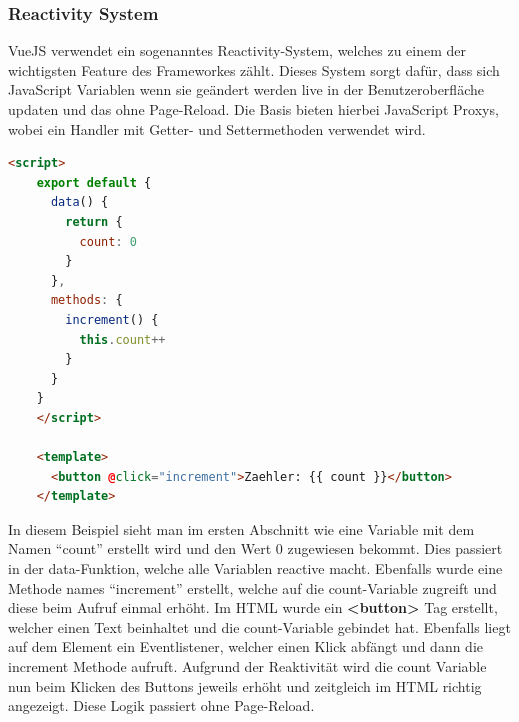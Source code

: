 \cite{frontend_web_vuejs_api}

\subsubsection{Reactivity System}
VueJS verwendet ein sogenanntes Reactivity-System, welches zu einem der wichtigsten Feature des Frameworkes zählt. Dieses System sorgt dafür, dass sich JavaScript Variablen wenn sie geändert werden live in der Benutzeroberfläche updaten und das ohne Page-Reload. Die Basis bieten hierbei JavaScript Proxys, wobei ein Handler mit Getter- und Settermethoden verwendet wird. 
\newpage
\begin{lstlisting}[language=html]
    <script>
    export default {
      data() {
        return {
          count: 0
        }
      },
      methods: {
        increment() {
          this.count++
        }
      }
    }
    </script>
    
    <template>
      <button @click="increment">Zaehler: {{ count }}</button>
    </template>
\end{lstlisting}

\cite{frontend_web_vuejs_reactivity}

In diesem Beispiel sieht man im ersten Abschnitt wie eine Variable mit dem Namen “count” erstellt wird und den Wert 0 zugewiesen bekommt. Dies passiert in der data-Funktion, welche alle Variablen reactive macht. Ebenfalls wurde eine Methode names “increment” erstellt, welche auf die count-Variable zugreift und diese beim Aufruf einmal erhöht. Im HTML wurde ein \textbf{<button>} Tag erstellt, welcher einen Text beinhaltet und die count-Variable gebindet hat. Ebenfalls liegt auf dem Element ein Eventlistener, welcher einen Klick abfängt und dann die increment Methode aufruft.
Aufgrund der Reaktivität wird die count Variable nun beim Klicken des Buttons jeweils erhöht und zeitgleich im HTML richtig angezeigt. Diese Logik passiert ohne Page-Reload.

\cite{frontend_web_vuejs_reactivity2}

